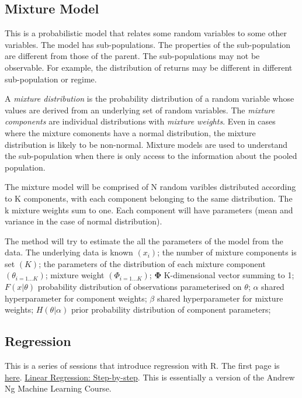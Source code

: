 \documentclass[12pt, a4paper, oneside]{article}\usepackage{graphicx, color}
\begin{document}
\subsection{Mixture Model}
This is a probabilistic model that relates some random variables to some other variables.  The model has sub-populations. The properties of the sub-population are different from those of the parent. The sub-populations may not be observable.  For example, the distribution of returns may be different in different sub-population or regime. 

A \emph{mixture distribution} is the probability distribution of a random variable  whose values are derived from an underlying set of random variables. The \emph{mixture components} are individual distributions with \emph{mixture weights}.  Even in cases where the mixture comonents have a normal distribution, the mixture distribution is likely to be non-normal. Mixture models are used to understand the sub-population when there is only access to the information about the pooled population. 

The mixture model will be comprised of N random varibles distributed according to K components, with each component belonging to the same distribution. The k mixture weights sum to one. Each component will have parameters (mean and variance in the case of normal distribution).  

The method will try to estimate the all the parameters of the model from the data.  The underlying data is known $(x_i)$; the number of mixture components is set $(K)$; the parameters of the distribution of each mixture component $(\theta_{i=1\dots K})$; mixture weight $(\Phi_{i = 1\dots K})$; $\mathbf{\Phi}$ K-dimensional vector summing to 1; $F(x|\theta)$ probability distribution of observations parameterised on $\theta$; $\alpha$ shared hyperparameter for component weights; $\beta$ shared hyperparameter for mixture weights; $H(\theta|\alpha)$ prior probability distribution of component parameters; 


\subsection{Regression}
This is a series of sessions that introduce regression with R.  The first page is \href{http://pingax.com/2013/11/}{here}.  \href{http://pingax.com/linear-regression-with-r-step-by-step-implementation-part-1/}{Linear Regression: Step-by-step}. This is essentially a version of the Andrew Ng Machine Learning Course.  
\end{document}
